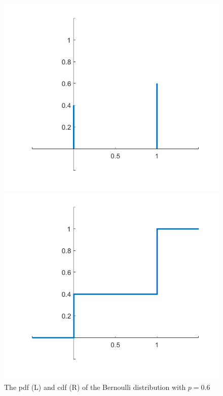 \begin{figure}[htbp]
 \begin{minipage}{.5\textwidth}
        \centering
	\includegraphics[width=0.9\linewidth]{fig/2_bernoulli_pdf}
    \end{minipage}
    \begin{minipage}{0.5\textwidth}
        \centering
	\includegraphics[width=0.9\linewidth]{fig/2_bernoulli_cdf}
    \end{minipage}	
    \caption{The pdf (L) and cdf (R) of the Bernoulli distribution with $p = 0.6$\label{fig:2_bernoulli_pdf}}
\end{figure}

